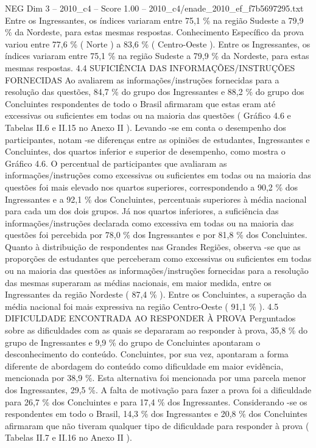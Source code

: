 \begin{textsample}{NEG Dim 3 – 2010\_c4 – Score 1.00 – 2010\_c4/enade\_2010\_ef\_f7b5697295.txt}
Entre os Ingressantes, os índices variaram entre 75,1 \% na região Sudeste a 79,9 \% da Nordeste, para estas mesmas respostas.
Conhecimento Específico da prova variou entre 77,6 \% ( Norte ) a 83,6 \% ( Centro-Oeste ).
Entre os Ingressantes, os índices variaram entre 75,1 \% na região Sudeste a 79,9 \% da Nordeste, para estas mesmas respostas. 4.4 SUFICIÊNCIA DAS INFORMAÇÕES/INSTRUÇÕES FORNECIDAS Ao avaliarem as informações/instruções fornecidas para a resolução das questões, 84,7 \% do grupo dos Ingressantes e 88,2 \% do grupo dos Concluintes respondentes de todo o Brasil afirmaram que estas eram até excessivas ou suficientes em todas ou na maioria das questões ( Gráfico 4.6 e Tabelas II.6 e II.15 no Anexo II ).
Levando -se em conta o desempenho dos participantes, notam -se diferenças entre as opiniões de estudantes, Ingressantes e Concluintes, dos quartos inferior e superior de desempenho, como mostra o Gráfico 4.6.
O percentual de participantes que avaliaram as informações/instruções como excessivas ou suficientes em todas ou na maioria das questões foi mais elevado nos quartos superiores, correspondendo a 90,2 \% dos Ingressantes e a 92,1 \% dos Concluintes, percentuais superiores à média nacional para cada um dos dois grupos.
Já nos quartos inferiores, a suficiência das informações/instruções declarada como excessiva em todas ou na maioria das questões foi percebida por 78,0 \% dos Ingressantes e por 81,8 \% dos Concluintes.
Quanto à distribuição de respondentes nas Grandes Regiões, observa -se que as proporções de estudantes que perceberam como excessivas ou suficientes em todas ou na maioria das questões as informações/instruções fornecidas para a resolução das mesmas superaram as médias nacionais, em maior medida, entre os Ingressantes da região Nordeste ( 87,4 \% ).
Entre os Concluintes, a superação da média nacional foi mais expressiva na região Centro-Oeste ( 91,1 \% ). 4.5 DIFICULDADE ENCONTRADA AO RESPONDER À PROVA Perguntados sobre as dificuldades com as quais se depararam ao responder à prova, 35,8 \% do grupo de Ingressantes e 9,9 \% do grupo de Concluintes apontaram o desconhecimento do conteúdo.
Concluintes, por sua vez, apontaram a forma diferente de abordagem do conteúdo como dificuldade em maior evidência, mencionada por 38,9 \%.
Esta alternativa foi mencionada por uma parcela menor dos Ingressantes, 29,5 \%.
A falta de motivação para fazer a prova foi a dificuldade para 26,7 \% dos Concluintes e para 17,4 \% dos Ingressantes.
Considerando -se os respondentes em todo o Brasil, 14,3 \% dos Ingressantes e 20,8 \% dos Concluintes afirmaram que não tiveram qualquer tipo de dificuldade para responder à prova ( Tabelas II.7 e II.16 no Anexo II ).

\end{textsample}
